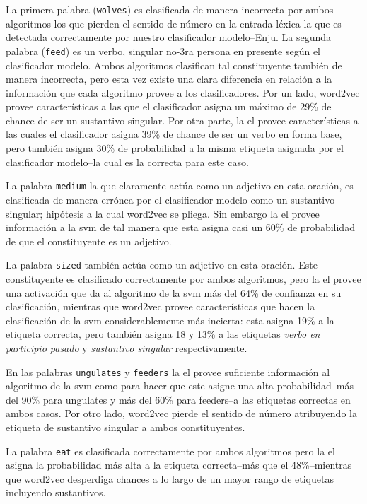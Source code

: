 {La primera palabra (\texttt{wolves}) es clasificada de manera incorrecta por ambos algoritmos los que pierden el sentido de número en la entrada léxica la que es detectada correctamente  por nuestro clasificador modelo--Enju. La segunda palabra (\texttt{feed}) es un verbo, singular no-3ra persona en presente según el clasificador modelo. Ambos algoritmos clasifican tal constituyente también de manera incorrecta, pero esta vez existe una clara diferencia en relación a la información que cada algoritmo provee a los clasificadores. Por un lado, word2vec provee características a las que el clasificador asigna un máximo de 29\% de chance  de ser un sustantivo singular. Por otra parte, la \gls{el} provee características a las cuales el clasificador asigna 39\% de chance de ser un verbo en forma base, pero también asigna 30\% de probabilidad a la misma etiqueta asignada por el clasificador modelo--la cual es la correcta para este caso.

La palabra \texttt{medium} la que claramente actúa como un adjetivo en esta oración, es clasificada de manera errónea por el clasificador modelo como un sustantivo singular; hipótesis a la cual word2vec se pliega. Sin embargo la \gls{el} provee información a la \gls{svm} de tal manera que esta asigna casi un 60\% de probabilidad de que el constituyente es un adjetivo.

La palabra \texttt{sized} también actúa como un adjetivo en esta oración. Este constituyente es clasificado correctamente por ambos algoritmos, pero la \gls{el} provee una activación que da al algoritmo de la \gls{svm} más del 64\% de confianza en su clasificación, mientras que word2vec provee características que hacen la clasificación de la \gls{svm} considerablemente más incierta: esta asigna 19\% a la etiqueta correcta, pero también asigna 18 y 13\% a las etiquetas \emph{verbo en participio pasado} y \emph{sustantivo singular} respectivamente.

En las palabras \texttt{ungulates} y \texttt{feeders} la \gls{el} provee suficiente información al algoritmo de la \gls{svm} como para hacer que este asigne una alta probabilidad--más del 90\% para ungulates y más del 60\% para feeders--a las etiquetas correctas en ambos casos. Por otro lado, word2vec pierde el sentido de número atribuyendo la etiqueta de sustantivo singular a ambos constituyentes.

La palabra \texttt{eat} es clasificada correctamente por ambos algoritmos pero la \gls{el} asigna la probabilidad más alta a la etiqueta correcta--más que el 48\%--mientras que word2vec desperdiga chances a lo largo de un mayor rango de etiquetas incluyendo sustantivos.

}
